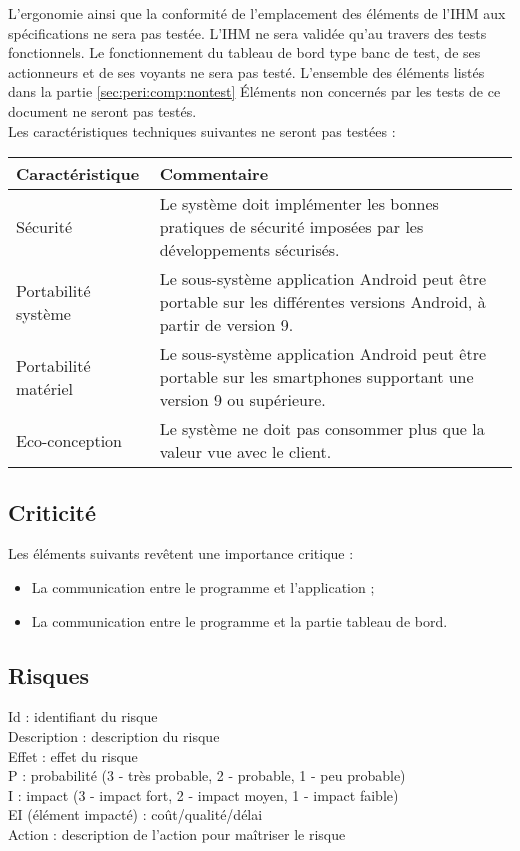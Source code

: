 L'ergonomie ainsi que la conformité de l'emplacement des éléments de l'IHM aux spécifications ne sera pas testée. L'IHM ne sera validée qu'au travers des tests fonctionnels. 
Le fonctionnement du tableau de bord type banc de test, de ses actionneurs et de ses voyants ne sera pas testé.
L'ensemble des éléments listés dans la partie \og \ref{sec:peri:comp:nontest} Éléments non concernés par les tests \fg de ce document ne seront pas testés.\\

Les caractéristiques techniques suivantes ne seront pas testées :
\noindent\begin{longtable}[c]{|p{}|p{}|}
    \hline
    \bf Caractéristique & \bf Commentaire\\
    \hline
    \endhead
    Sécurité & Le système doit implémenter les bonnes pratiques de sécurité imposées par les développements sécurisés.\\
    \hline
    Portabilité système & Le sous-système application Android peut être portable sur les différentes versions Android, à partir de version 9.\\
    \hline
    Portabilité matériel & Le sous-système application Android peut être portable sur les smartphones supportant une version 9 ou supérieure.\\
    \hline
    Eco-conception & Le système ne doit pas consommer plus que la valeur vue avec le client.\\
    \hline
\end{longtable}

\subsection{Criticité}
\label{sec:peri:criticite}

Les éléments suivants revêtent une importance critique :
\begin{itemize}
    \item La communication entre le programme {\appliC} et l'application {\appliA} ;
    \item La communication entre le programme {\appliC} et la partie tableau de bord.
\end{itemize}

\subsection{Risques}
\label{sec:peri:risques}

\noindent Id : identifiant du risque\\
Description : description du risque\\
Effet : effet du risque\\
P : probabilité (3 - très probable, 2 - probable, 1 - peu probable)\\
I : impact (3 - impact fort, 2 - impact moyen, 1 - impact faible)\\
EI (élément impacté) : coût/qualité/délai\\
Action : description de l'action pour maîtriser le risque

